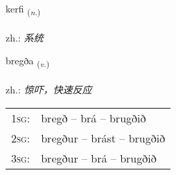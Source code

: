 \documentclass[frontgrid, backgrid]{flacards}\usepackage[]{graphicx}\usepackage[]{xcolor}
\begin{document}
\renewcommand{\blhead}{\vskip5pt {\small\bfseries\footnotesize Nafnorð | 名词 }}
\renewcommand{\bcfoot}{\vskip5pt \hspace{2pt}{\small\bfseries\footnotesize 1K}}


{kerfi \small{\textsubscript{(\textit{n.})}} \\[1ex] %
\textphonetic{[cʰɛrvɪ]} \\
zh.: \emph{系统} \\  [2ex]
\renewcommand*{\arraystretch}{0.8}
}

\renewcommand{\flhead}{\vskip5pt \fboxsep=0pt {\small\bfseries\footnotesize Sagnorð | 动词}}
\renewcommand{\fcfoot}{\vskip5pt \fboxsep=0pt \hspace{2pt}{\small\bfseries\footnotesize 1K}}

\renewcommand{\blhead}{\vskip5pt {\small\bfseries\footnotesize Sagnorð | 动词 }}
\renewcommand{\bcfoot}{\vskip5pt \hspace{2pt}{\small\bfseries\footnotesize 1K}}


{bregða \small{\textsubscript{(\textit{v.})}} \\[1ex] %
\textphonetic{[prɛɣða]} \\
zh.: \emph{惊吓，快速反应} \\  [2ex]
\renewcommand*{\arraystretch}{0.8}
\begin{tabular}{p{1cm}l}
\textsc{1sg}: & bregð -- brá -- brugðið \\ 
\textsc{2sg}: & bregður -- brást -- brugðið \\ 
\textsc{3sg}: & bregður -- brá -- brugðið \\ 
\end{tabular}
}

\renewcommand{\flhead}{\vskip5pt \fboxsep=0pt {\small\bfseries\footnotesize Atviksorð | 副词}}
\renewcommand{\fcfoot}{\vskip5pt \fboxsep=0pt \hspace{2pt}{\small\bfseries\footnotesize 1K}}
\end{document}
